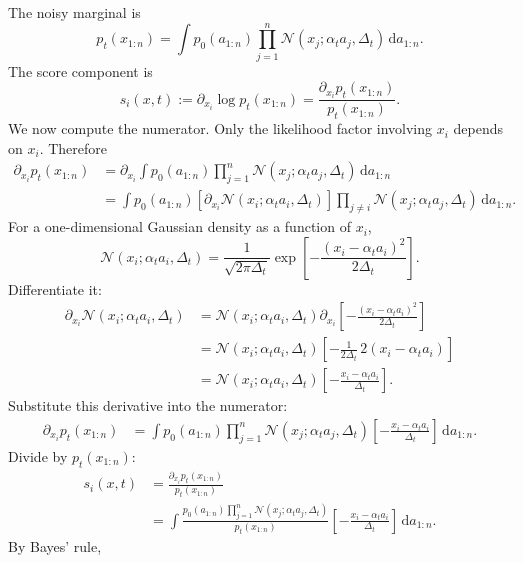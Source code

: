 \documentclass[11pt]{article}
\newcommand{\N}{\mathcal{N}}
\newcommand{\dd}{\,\mathrm{d}}
\begin{document}
The noisy marginal is
\begin{equation}
  p_t(x_{1:n})
  =
  \int
  p_0(a_{1:n})
  \prod_{j=1}^n \N(x_j;\alpha_t a_j,\Delta_t)
  \dd a_{1:n}.
  \label{eq:noisy-marginal}
\end{equation}
The score component is
\begin{equation}
  s_i(x,t)
  :=\partial_{x_i}\log p_t(x_{1:n})
  =\frac{\partial_{x_i}p_t(x_{1:n})}{p_t(x_{1:n})}.
\end{equation}
We now compute the numerator. Only the likelihood factor involving \(x_i\) depends on \(x_i\). Therefore
\begin{align}
  \partial_{x_i}p_t(x_{1:n})
  &=
  \partial_{x_i}
  \int
  p_0(a_{1:n})
  \prod_{j=1}^n \N(x_j;\alpha_t a_j,\Delta_t)
  \dd a_{1:n} \\
  &=
  \int
  p_0(a_{1:n})
  \left[\partial_{x_i}\N(x_i;\alpha_t a_i,\Delta_t)\right]
  \prod_{j\ne i}\N(x_j;\alpha_t a_j,\Delta_t)
  \dd a_{1:n}.
\end{align}
For a one-dimensional Gaussian density as a function of \(x_i\),
\begin{equation}
  \N(x_i;\alpha_t a_i,\Delta_t)
  =\frac{1}{\sqrt{2\pi\Delta_t}}
  \exp\left[-\frac{(x_i-\alpha_t a_i)^2}{2\Delta_t}\right].
\end{equation}
Differentiate it:
\begin{align}
  \partial_{x_i}\N(x_i;\alpha_t a_i,\Delta_t)
  &=
  \N(x_i;\alpha_t a_i,\Delta_t)
  \partial_{x_i}\left[-\frac{(x_i-\alpha_t a_i)^2}{2\Delta_t}\right] \\
  &=
  \N(x_i;\alpha_t a_i,\Delta_t)
  \left[-\frac{1}{2\Delta_t}\,2(x_i-\alpha_t a_i)\right] \\
  &=
  \N(x_i;\alpha_t a_i,\Delta_t)
  \left[-\frac{x_i-\alpha_t a_i}{\Delta_t}\right].
\end{align}
Substitute this derivative into the numerator:
\begin{align}
  \partial_{x_i}p_t(x_{1:n})
  &=
  \int
  p_0(a_{1:n})
  \prod_{j=1}^n\N(x_j;\alpha_t a_j,\Delta_t)
  \left[-\frac{x_i-\alpha_t a_i}{\Delta_t}\right]
  \dd a_{1:n}.
\end{align}
Divide by \(p_t(x_{1:n})\):
\begin{align}
  s_i(x,t)
  &=
  \frac{\partial_{x_i}p_t(x_{1:n})}{p_t(x_{1:n})} \\
  &=
  \int
  \frac{p_0(a_{1:n})\prod_{j=1}^n\N(x_j;\alpha_t a_j,\Delta_t)}{p_t(x_{1:n})}
  \left[-\frac{x_i-\alpha_t a_i}{\Delta_t}\right]
  \dd a_{1:n}.
\end{align}
By Bayes' rule,
\end{document}
